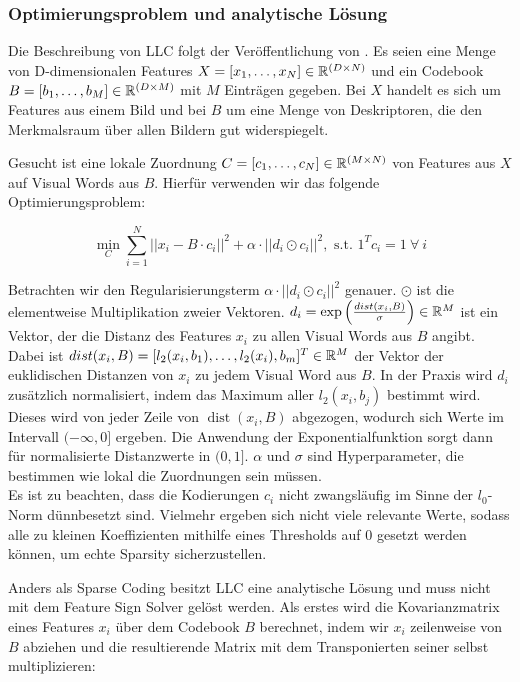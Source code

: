 \subsubsection{Optimierungsproblem und analytische Lösung}
\label{sec:llc}

Die Beschreibung von LLC folgt der Veröffentlichung von \cite{wyylhg10}. Es seien eine Menge von D-dimensionalen Features $X = [x_1, \dots, x_N] \in \mathbb{R}^{(D \times N)}$ und ein Codebook $B = [b_1, \dots, b_M] \in \mathbb{R}^{(D \times M)}$ mit $M$ Einträgen gegeben. Bei $X$ handelt es sich um Features aus einem Bild und bei $B$ um eine Menge von Deskriptoren, die den Merkmalsraum über allen Bildern gut widerspiegelt.
 
Gesucht ist eine lokale Zuordnung $C = [c_1, \dots, c_N] \in \mathbb{R}^{(M \times N)}$ von Features aus $X$ auf Visual Words aus $B$. Hierfür verwenden wir das folgende Optimierungsproblem:

\begin{equation}
\min_C \sum_{i=1}^{N} ||x_i - B\cdot c_i||^2 + \alpha\cdot ||d_i \odot c_i||^2, \text{ s.t. } 1^Tc_i = 1 \: \forall \: i
\end{equation}

Betrachten wir den Regularisierungsterm $\alpha\cdot ||d_i \odot c_i||^2$ genauer. $\odot$ ist die elementweise Multiplikation zweier Vektoren. $d_i = \exp \left( \frac{ \mathop{dist}(x_i, B)}{\sigma} \right) \in \mathbb{R}^{M}$ ist ein Vektor, der die Distanz des Features $x_i$ zu allen Visual Words aus $B$ angibt. Dabei ist $\mathop{dist}(x_i, B) = [l_2(x_i, b_1), \dots, l_2(x_i), b_m]^T \in \mathbb{R}^M$ der Vektor der euklidischen Distanzen von $x_i$ zu jedem Visual Word aus $B$. In der Praxis wird $d_i$ zusätzlich normalisiert, indem das Maximum aller $l_2(x_i, b_j)$ bestimmt wird. Dieses wird von jeder Zeile von $\mathop{dist}(x_i, B)$ abgezogen, wodurch sich Werte im Intervall $(-\infty, 0]$ ergeben. Die Anwendung der Exponentialfunktion sorgt dann für normalisierte Distanzwerte in $(0, 1]$. $\alpha$ und $\sigma$ sind Hyperparameter, die bestimmen wie lokal die Zuordnungen sein müssen. \\
Es ist zu beachten, dass die Kodierungen $c_i$ nicht zwangsläufig im Sinne der $l_0$-Norm dünnbesetzt sind. Vielmehr ergeben sich nicht viele relevante Werte, sodass alle zu kleinen Koeffizienten mithilfe eines Thresholds auf 0 gesetzt werden können, um echte Sparsity sicherzustellen. 

Anders als Sparse Coding besitzt LLC eine analytische Lösung und muss nicht mit dem Feature Sign Solver gelöst werden. Als erstes wird die Kovarianzmatrix eines Features $x_i$ über dem Codebook $B$ berechnet, indem wir $x_i$ zeilenweise von $B$ abziehen und die resultierende Matrix mit dem Transponierten seiner selbst multiplizieren:

